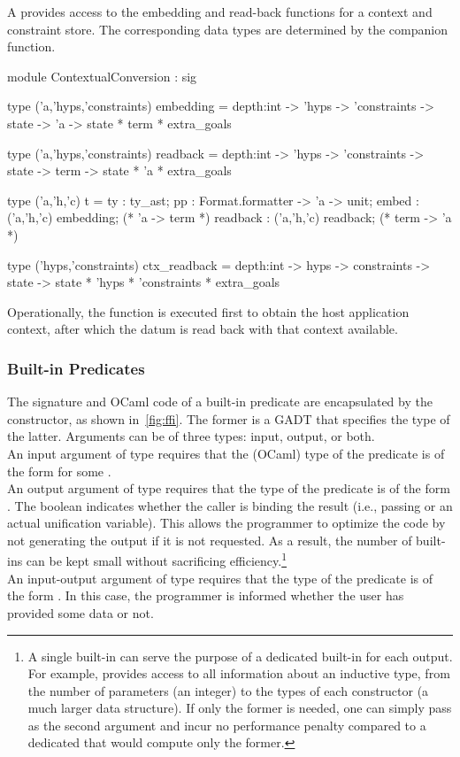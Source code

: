 \documentclass[a4paper, 11pt]{book}
\begin{document}
A  provides access to the embedding and
read-back functions for a context and constraint store. The corresponding data
types are determined by the  companion function.

\begin{ocamlcode}
module ContextualConversion : sig

type ('a,'hyps,'constraints) embedding =
  depth:int -> 'hyps -> 'constraints ->
  state -> 'a -> state * term * extra_goals

type ('a,'hyps,'constraints) readback =
  depth:int -> 'hyps -> 'constraints ->
  state -> term -> state * 'a * extra_goals

type ('a,'h,'c) t = {
  ty : ty_ast;
  pp : Format.formatter -> 'a -> unit;
  embed : ('a,'h,'c) embedding;   (* 'a -> term *)
  readback : ('a,'h,'c) readback; (* term -> 'a *)
}

type ('hyps,'constraints) ctx_readback =
  depth:int -> hyps -> constraints ->
  state -> state * 'hyps * 'constraints * extra_goals
\end{ocamlcode}

\noindent
Operationally, the  function is executed first to obtain
the host application context, after which the datum is read back with that
context available.

\subsubsection{Built-in Predicates}\label{sec:builtins}

The signature and OCaml code of a built-in predicate are encapsulated by the
 constructor, as shown in~\cref{fig:ffi}. The former is a GADT that
specifies the type of the latter. Arguments can be of three types: input,
output, or both.\\
An input argument of type  requires that the (OCaml) type of the predicate
 is of the form  for some .\\
An output argument of type  requires that the type of the predicate
 is of the form . The boolean indicates
whether the caller is binding the result (i.e., passing \elpi{_} or an actual unification variable). This allows
the programmer to optimize the code by not generating the output if it is not
requested. As a result, the number of built-ins can be kept small without
sacrificing efficiency.\footnote{A single built-in can serve the purpose of a
dedicated built-in for each output. For example,  provides
access to all information about an inductive type, from the number of
parameters (an integer) to the types of each constructor (a much larger data
structure). If only the former is needed, one can simply pass \elpi{_} as the
second argument and incur no performance penalty compared to a dedicated
 that would compute only the former.}\\
An input-output argument of type  requires that the type of the
predicate  is of the form . In this
case, the programmer is informed whether the user has provided some data or
not.
\end{document}
